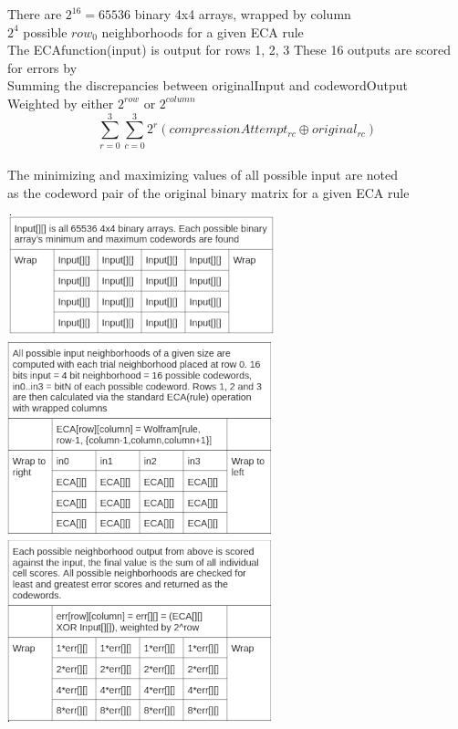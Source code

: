 \documentclass[11pt]{article}
\begin{document}
\begin{center}
There are $2^{16}=65536$ binary 4x4 arrays, wrapped by column\\
$2^4$ possible $row_0$ neighborhoods for a given ECA rule\\
The ECAfunction(input) is output for rows 1, 2, 3
These 16 outputs are scored for errors by\\
Summing the discrepancies between originalInput and codewordOutput\\
Weighted by either $2^{row}$ or $2^{column}$\\
\[  \sum_{r=0}^{3} \sum_{c=0}^{3} 2^r ( compressionAttempt_{r c} \oplus original_{r c}) \]\\
 The minimizing and maximizing values of all possible input are noted\\
 as the codeword pair of the original binary matrix for a given ECA rule\\
 \end{center}
 \begin{center}
\includegraphics{FourByFourC}
\includegraphics{FourByFourA}
\includegraphics{FourByFourB}
\end{center}
\end{document}

